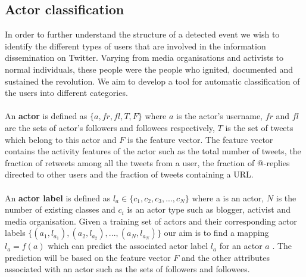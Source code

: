 \subsection{Actor classification  }\label{sec:ActorClassification}
In order to further understand the structure of a detected event we wish to identify the different types of users that are involved in the information dissemination on Twitter. Varying from media organisations and activists to normal individuals, these people were the people who ignited, documented and sustained the revolution. We aim to develop a tool for automatic classification of the users into different categories.\\\\
An \textbf{actor} is defined as $\{a, fr, fl, T, F\}$ where \boldmath $a$ \unboldmath is the actor's username, $fr$ and $fl$ are the sets of actor's followers and followees respectively, $T$ is the set of tweets which belong to this actor and $F$ is the feature vector. The feature vector contains the activity features of the actor such as the total number of tweets, the fraction of retweets among all the tweets from a user, the fraction of @-replies directed to other users and the fraction of tweets containing a URL.\\\\
An \textbf{actor label} is defined as $l_a \in \{c_1, c_2, c_3,..., c_N\}$ where a is an actor, $N$ is the number of existing classes and $c_i$ is an actor type such as blogger, activist and media organisation. 
Given a training set of actors and their corresponding actor labels $\{(a_1, l_{a_1}), (a_2, l_{a_2}),..., (a_N, l_{a_N})\}$ our aim is to find a mapping $l_a = f(a)$ which can predict the associated actor label $l_a$ for an actor \boldmath $a$ \unboldmath. The prediction will be based on the feature vector $F$ and the other attributes associated with an actor such as the sets of followers and followees.

